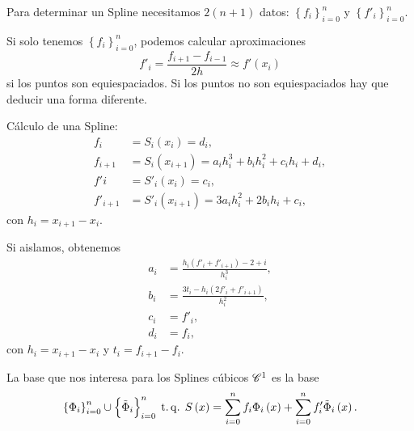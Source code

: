 Para determinar un Spline necesitamos $2(n+1)$ datos: $\left\{ f_i \right\}_{i=0}^n$ y $\left\{ f'_i \right\}_{i=0}^n$.

\begin{obs}
    Si solo tenemos $\left\{ f_i \right\}_{i=0}^n$, podemos calcular aproximaciones
    \[
        f'_i = \frac{f_{i+1}-f_{i-1}}{2h}\approx f'\left( x_i \right)
    \]
    si los puntos son equiespaciados. Si los puntos no son equiespaciados hay que deducir una forma diferente.

    Cálculo de una Spline:
    \begin{align*}
        f_i &= S_i\left( x_i \right) = d_i, \\
        f_{i+1} &= S_i\left( x_{i+1} \right) = a_i h_i^3 + b_ih_i^2 + c_ih_i + d_i, \\
        f'i &= S'_i\left( x_i \right) = c_i, \\
        f'_{i+1} &= S'_i\left( x_{i+1} \right) = 3a_ih_i^2 + 2b_ih_i + c_i,
    \end{align*}
    con $h_i = x_{i+1} - x_i$.

    Si aislamos, obtenemos
    \begin{align*}
        a_i &= \frac{h_i\left( f'_i + f'_{i+1} \right) - 2+i}{h_i^3}, \\
        b_i &= \frac{3t_i - h_i\left( 2f'_i + f'_{i+1} \right)}{h_i^2}, \\
        c_i &= f'_i, \\
        d_i &= f_i,
    \end{align*}
    con $h_i = x_{i+1} - x_i$ y $t_i = f_{i+1} - f_i$.
\end{obs}

La base que nos interesa para los Splines cúbicos $\mathscr{C}^1$ es la base 
\[
    \left\{ \Phi_i \right\}_{i=0}^n \cup \left\{ \tilde{\Phi}_i \right\}_{i=0}^n \operatorname{\;t.q.\;} S\left( x \right) = \sum_{i=0}^n f_i\Phi_i\left( x \right) + \sum_{i=0}^n f'_i\tilde{\Phi}_i\left( x \right).
\]

